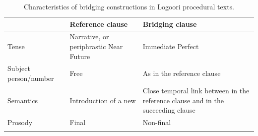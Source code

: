 \documentclass[output=paper]{LSP/langsci}
\begin{document}


\begin{table}
\small
\caption{Characteristics of bridging constructions in Logoori procedural texts.}
\label{SaTabl1}
\begin{tabularx}{\textwidth}{lQQ}
\lsptoprule
 & {Reference clause} & {Bridging clause}       \\
\midrule
{Tense}     & Narrative, or  periphrastic Near Future           & Immediate Perfect              \\ \tablevspace 
{Subject person\slash number}      & Free                      & As in the reference clause     \\ \tablevspace                 
{Semantics} &    	Introduction of a new   & Close temporal link between  in the reference clause and  in the succeeding clause\\\tablevspace
{Prosody}                    & Final                     & Non-final                      \\
\lspbottomrule
\end{tabularx}
\end{table}
\end{document}
